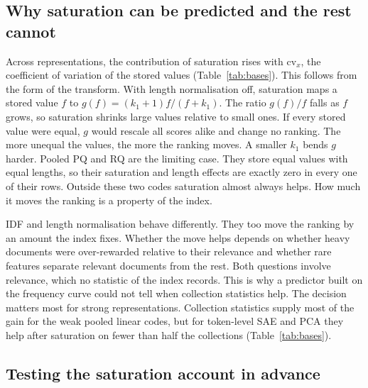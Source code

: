 \documentclass[11pt]{article}
\begin{document}
\subsection{Why saturation can be predicted and the rest cannot}
\label{sec:predicts}

Across representations, the contribution of saturation rises with $\mathrm{cv}_x$, the
coefficient of variation of the stored values (Table~\ref{tab:bases}). This follows from
the form of the transform. With length normalisation off, saturation maps a stored value $f$ to
$g(f) = (k_1+1)f/(f+k_1)$. The ratio $g(f)/f$ falls as $f$ grows, so saturation shrinks
large values relative to small ones. If every stored value were equal, $g$ would rescale
all scores alike and change no ranking. The more unequal the values, the more the ranking
moves. A smaller $k_1$ bends $g$ harder. Pooled PQ and RQ are the limiting case. They store
equal values with equal lengths, so their saturation and length effects are exactly zero
in every one of their rows. Outside these two codes saturation almost always helps. How
much it moves the ranking is a property of the index.

IDF and length normalisation behave differently. They too move the ranking by an amount
the index fixes. Whether the move helps depends on whether heavy documents were
over-rewarded relative to their relevance and whether rare features separate relevant
documents from the rest. Both questions involve relevance, which no statistic of the index
records. This is why a predictor built on the frequency curve could not tell when
collection statistics help. The decision matters most for strong representations.
Collection statistics supply most of the gain for the weak pooled linear codes, but for
token-level SAE and PCA they help after saturation on fewer than half the collections
(Table~\ref{tab:bases}).

\subsection{Testing the saturation account in advance}
\end{document}
